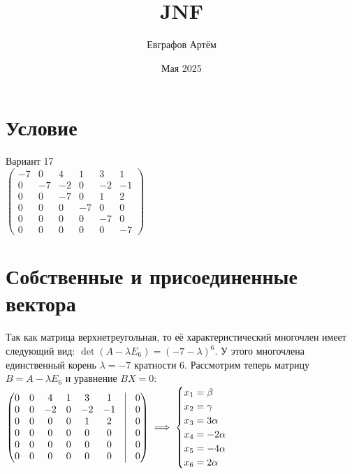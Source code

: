 


\title{\centering JNF}  
\author{\centering Евграфов Артём}  
\date{ Мая 2025} 


\maketitle
\newpage
\setcounter{page}{1}
\tableofcontents
\newpage
\section{Условие}
Вариант 17 \\

\noindent \(\displaystyle
\begin{pmatrix}
-7 &   0 &  4 &  1 &  3 &  1 \\
 0 &  -7 & -2 &  0 & -2 & -1 \\
 0 &   0 & -7 &  0 &  1 &  2 \\
 0 &   0 &  0 & -7 &  0 &  0 \\
 0 &   0 &  0 &  0 & -7 &  0 \\
 0 &   0 &  0 &  0 &  0 & -7
\end{pmatrix}
\)
\section{Собственные и присоединенные вектора}
Так как матрица верхнетреугольная, то её характеристический многочлен имеет следующий вид: \(\det(A-\lambda E_6) = (-7 - \lambda)^6.\) У этого многочлена единственный корень $\lambda = -7$ кратности 6. Рассмотрим теперь матрицу $B = A - \lambda E_6$ и уравнение $BX = 0$: \\

\noindent \(\displaystyle
\begin{pmatrix}
0 &   0 &  4 &  1 &  3 &  1 & \vline & 0\\
 0 &  0 & -2 &  0 & -2 & -1 & \vline & 0 \\
 0 &   0 & 0 &  0 &  1 &  2 & \vline & 0\\
 0 &   0 &  0 & 0 &  0 &  0 & \vline & 0\\
 0 &   0 &  0 &  0 & 0 &  0 & \vline & 0\\
 0 &   0 &  0 &  0 &  0 & 0 & \vline & 0
\end{pmatrix}
\implies 
\begin{cases}
x_1 = \beta \\
x_2 = \gamma \\
x_3 = 3\alpha \\
x_4 = -2\alpha \\
x_5 = -4\alpha \\
x_6 = 2\alpha
\end{cases}
\) \\

